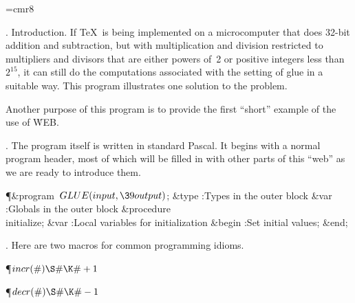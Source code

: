 

\def\PASCAL{Pascal}
\font\eightrm=cmr8

\def\title{GLUE}
\def\topofcontents{\null
  \def\titlepage{F} %
  \def\rheader{\mainfont\hfil \contentspagenumber}
  \vfill
  \centerline{\titlefont Fixed-Point Glue Setting}
  \vfill}
\def\botofcontents{\vfill
  \centerline{\hsize 6in\baselineskip9pt
    \vbox{\eightrm\baselineskip9pt\noindent
    The preparation of this report
    was supported in part by the National Science
    Foundation under grants IST-7921977 and MCS-7723728;
    by Office of Naval Research grant N00014-81-K-0330;
    and by the IBM Corporation. `\TeX' is a
    trademark of the American Mathematical Society.}}}


.  Introduction.
If \TeX\ is being implemented on a microcomputer that does 32-bit
addition and subtraction, but with multiplication and division restricted to
multipliers and divisors that are either powers of~2 or positive
integers less than~$2^{15}$, it can still do the computations associated
with the setting of glue in a suitable way. This program illustrates one
solution to the problem.

Another purpose of this program is to provide the first ``short'' example
of the use of \.{WEB}.

\fi

. The program itself is written in standard \PASCAL. It begins with a
normal program header, most of which will be filled in with other parts of this
``web'' as we are ready to introduce them.

\Y\P\4\&{program}\1\  $\\{GLUE}(\\{input},\39\\{output})$;\6
\4\&{type} :Types in the outer block\X\6
\4\&{var} :Globals in the outer block\X\6
\4\&{procedure}\1\  \\{initialize};\6
\4\&{var} :Local variables for initialization\X\2\6
\&{begin} :Set initial values\X;\6
\&{end};\par
\fi

. Here are two macros for common programming idioms.

\Y\P\D {}$\\{incr}(\#)\S\#\K\#+1$\par
\P\D {}$\\{decr}(\#)\S\#\K\#-1$\par
\fi

